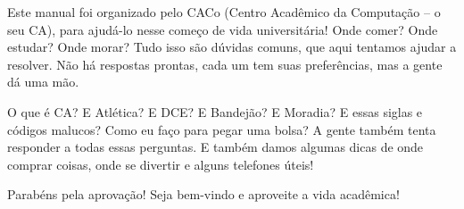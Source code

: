 Este manual foi organizado pelo CACo (Centro Acadêmico da Computação -- o seu
CA), para ajudá-lo nesse começo de vida universitária! Onde comer? Onde estudar?
Onde morar? Tudo isso são dúvidas comuns, que aqui tentamos ajudar a resolver.
Não há respostas prontas, cada um tem suas preferências, mas a gente dá uma mão.

O que é CA? E Atlética? E DCE? E Bandejão? E Moradia? E essas siglas e códigos
malucos? Como eu faço para pegar uma bolsa? A gente também tenta responder a todas
essas perguntas. E também damos algumas dicas de onde comprar coisas, onde se
divertir e alguns telefones úteis!

Parabéns pela aprovação! Seja bem-vindo e aproveite a vida acadêmica!
